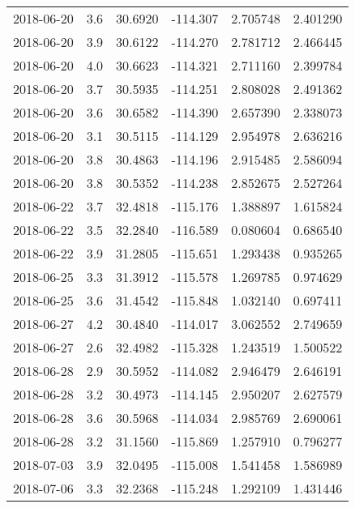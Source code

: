 \begin{tabular}{lrrrrr}
2018-06-20 &       3.6 &  30.6920 &  -114.307 &         2.705748 &         2.401290 \\
2018-06-20 &       3.9 &  30.6122 &  -114.270 &         2.781712 &         2.466445 \\
2018-06-20 &       4.0 &  30.6623 &  -114.321 &         2.711160 &         2.399784 \\
2018-06-20 &       3.7 &  30.5935 &  -114.251 &         2.808028 &         2.491362 \\
2018-06-20 &       3.6 &  30.6582 &  -114.390 &         2.657390 &         2.338073 \\
2018-06-20 &       3.1 &  30.5115 &  -114.129 &         2.954978 &         2.636216 \\
2018-06-20 &       3.8 &  30.4863 &  -114.196 &         2.915485 &         2.586094 \\
2018-06-20 &       3.8 &  30.5352 &  -114.238 &         2.852675 &         2.527264 \\
2018-06-22 &       3.7 &  32.4818 &  -115.176 &         1.388897 &         1.615824 \\
2018-06-22 &       3.5 &  32.2840 &  -116.589 &         0.080604 &         0.686540 \\
2018-06-22 &       3.9 &  31.2805 &  -115.651 &         1.293438 &         0.935265 \\
2018-06-25 &       3.3 &  31.3912 &  -115.578 &         1.269785 &         0.974629 \\
2018-06-25 &       3.6 &  31.4542 &  -115.848 &         1.032140 &         0.697411 \\
2018-06-27 &       4.2 &  30.4840 &  -114.017 &         3.062552 &         2.749659 \\
2018-06-27 &       2.6 &  32.4982 &  -115.328 &         1.243519 &         1.500522 \\
2018-06-28 &       2.9 &  30.5952 &  -114.082 &         2.946479 &         2.646191 \\
2018-06-28 &       3.2 &  30.4973 &  -114.145 &         2.950207 &         2.627579 \\
2018-06-28 &       3.6 &  30.5968 &  -114.034 &         2.985769 &         2.690061 \\
2018-06-28 &       3.2 &  31.1560 &  -115.869 &         1.257910 &         0.796277 \\
2018-07-03 &       3.9 &  32.0495 &  -115.008 &         1.541458 &         1.586989 \\
2018-07-06 &       3.3 &  32.2368 &  -115.248 &         1.292109 &         1.431446 \\

\end{tabular}
